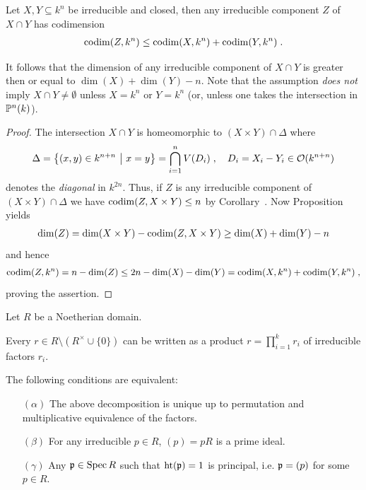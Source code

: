 \documentclass[a4paper,parskip=half,numbers=enddot, DIV=12]{scrreprt}
\begin{document}
\begin{thm}
    Let $X,Y\subseteq k^n$ be irreducible and closed, then any irreducible component $Z$ of $X\cap Y$ has codimension 
    \begin{align*}
    	\operatorname{codim}(Z,k^n)\leq\operatorname{codim}(X,k^n) +\operatorname{codim}(Y,k^n)\;.
    \end{align*}
\end{thm}
\begin{rem*}
    It follows that the dimension of any irreducible component of $X\cap Y$ is greater then or equal to $\dim (X)+\dim (Y) -n$. Note that the assumption \emph{does not} imply $X\cap Y \not= \emptyset$ unless $X=k^n$ or $Y=k^n$ (or, unless one takes the intersection in $\mathbb{P}^n(k)$).
\end{rem*}
\begin{proof}
    The intersection $X\cap Y$ is homeomorphic to $(X\times Y)\cap \Delta$ where 
    \begin{align*}
    	\Delta = \left\{(x,y)\in k^{n+n}\ \middle|\  x=y\right\} = \bigcap_{i=1}^n V(D_i)\;,\quad D_i = X_i -Y_i \in \mathcal{O}(k^{n+n})
    \end{align*}
    denotes the \emph{diagonal} in $k^{2n}$. Thus, if $Z$ is any irreducible component of $(X\times Y)\cap \Delta$ we have $\operatorname{codim}(Z,X\times Y) \leq n$ by Corollary~.  Now Proposition~ yields
    \begin{align*}
	    \dim(Z) = \dim(X\times Y) -\operatorname{codim}(Z,X\times Y) \geq \dim(X)+\dim(Y) -n
    \end{align*}
   and hence
   \begin{align*}
	   	\operatorname{codim}(Z,k^n) = n-\dim(Z) \leq 2n -\dim (X) -\dim (Y) = \operatorname{codim}(X,k^n)+\operatorname{codim}(Y,k^n)\;,
   \end{align*}
   proving the assertion.
\end{proof}
\begin{thm}
 Let $R$ be a Noetherian domain. 
 \begin{alphanumerate}
    \item 
        Every $r\in R\setminus (R^\times \cup\{0\})$ can be written as a product $r = \prod_{i=1}^k r_i$ of irreducible factors $r_i$. 
    \item 
        The following conditions are equivalent:
        \begin{itemize}
            \item[$(\alpha)$]
                The above decomposition is unique up to permutation and multiplicative equivalence of the factors.
            \item[$(\beta)$]
                For any irreducible $p\in R$, $(p)=pR$ is a prime ideal.
            \item[$(\gamma)$]
                Any $\mathfrak{p}\in\operatorname{Spec} R$ such that $\operatorname{ht}(\mathfrak{p}) = 1$ is principal, i.e. $\mathfrak{p} = (p)$ for some $p\in R$.
        \end{itemize}
 \end{alphanumerate}
\end{thm}
\end{document}
